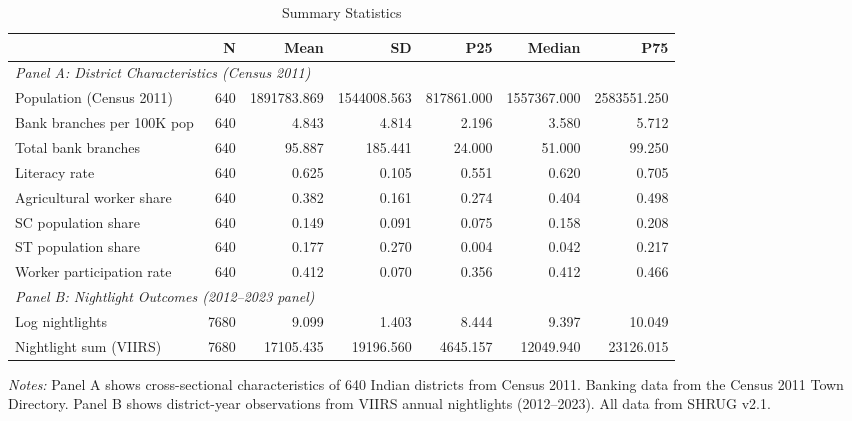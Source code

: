 \begin{table}[htbp]
\centering
\caption{Summary Statistics}
\label{tab:summary}
\small
\begin{tabular}{lrrrrrr}
\hline\hline
 & N & Mean & SD & P25 & Median & P75 \\
\hline
\multicolumn{7}{l}{\textit{Panel A: District Characteristics (Census 2011)}} \\
Population (Census 2011)            & 640 & 1891783.869 & 1544008.563 & 817861.000 & 1557367.000 & 2583551.250 \\
Bank branches per 100K pop          & 640 & 4.843 & 4.814 & 2.196 & 3.580 & 5.712 \\
Total bank branches                 & 640 & 95.887 & 185.441 & 24.000 & 51.000 & 99.250 \\
Literacy rate                       & 640 & 0.625 & 0.105 & 0.551 & 0.620 & 0.705 \\
Agricultural worker share           & 640 & 0.382 & 0.161 & 0.274 & 0.404 & 0.498 \\
SC population share                 & 640 & 0.149 & 0.091 & 0.075 & 0.158 & 0.208 \\
ST population share                 & 640 & 0.177 & 0.270 & 0.004 & 0.042 & 0.217 \\
Worker participation rate           & 640 & 0.412 & 0.070 & 0.356 & 0.412 & 0.466 \\
\hline
\multicolumn{7}{l}{\textit{Panel B: Nightlight Outcomes (2012--2023 panel)}} \\
Log nightlights                     & 7680 & 9.099 & 1.403 & 8.444 & 9.397 & 10.049 \\
Nightlight sum (VIIRS)              & 7680 & 17105.435 & 19196.560 & 4645.157 & 12049.940 & 23126.015 \\
\hline\hline
\end{tabular}
\begin{minipage}{0.95\textwidth}
\footnotesize
\textit{Notes:} Panel A shows cross-sectional characteristics of 640 Indian districts from Census 2011.
Banking data from the Census 2011 Town Directory. Panel B shows district-year observations
from VIIRS annual nightlights (2012--2023). All data from SHRUG v2.1.
\end{minipage}
\end{table}
